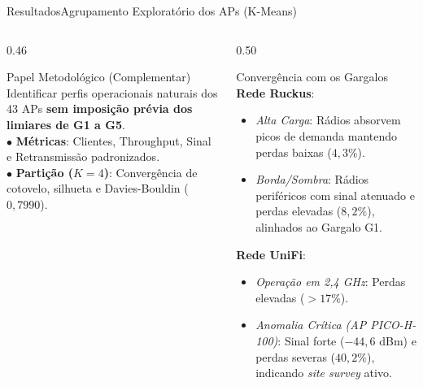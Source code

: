 \documentclass[10pt,brazil]{beamer}
\begin{document}
    \begin{frame}[label=slide_kmeans_resumo]{Resultados}{Agrupamento Exploratório dos APs (K-Means)}
        \begin{columns}[t,onlytextwidth]
            \begin{column}{0.46\textwidth}
                \begin{block}{Papel Metodológico (Complementar)}
                    \scriptsize
                    Identificar perfis operacionais naturais dos 43 APs \textbf{sem imposição prévia dos limiares de G1 a G5}.\\[4pt]
                    $\bullet$ \textbf{Métricas}: Clientes, Throughput, Sinal e Retransmissão padronizados.\\[2pt]
                    $\bullet$ \textbf{Partição ($K=4$)}: Convergência de cotovelo, silhueta e Davies-Bouldin ($0,7990$).
                \end{block}
                \vspace{0.3cm}
                \begin{center}
                    \hyperlink{zoom_kmeans_metricas}{} \quad
                    \hyperlink{zoom_kmeans_ruckus}{} \quad
                    \hyperlink{zoom_kmeans_unifi}{}
                \end{center}
            \end{column}
            \hfill
            \begin{column}{0.50\textwidth}
                \begin{block}{Convergência com os Gargalos}
                    \scriptsize
                    \textbf{Rede Ruckus}:
                    \begin{itemize}
                        \item \textit{Alta Carga}: Rádios absorvem picos de demanda mantendo perdas baixas ($4,3\%$).
                        \item \textit{Borda/Sombra}: Rádios periféricos com sinal atenuado e perdas elevadas ($8,2\%$), alinhados ao Gargalo G1.
                    \end{itemize}
                    \vspace{2pt}
                    \textbf{Rede UniFi}:
                    \begin{itemize}
                        \item \textit{Operação em 2,4 GHz}: Perdas elevadas ($> 17\%$).
                        \item \textit{Anomalia Crítica (AP PICO-H-100)}: Sinal forte ($-44,6$ dBm) e perdas severas ($40,2\%$), indicando \textit{site survey} ativo.
                    \end{itemize}
                \end{block}
            \end{column}
        \end{columns}
    \end{frame}
\end{document}
